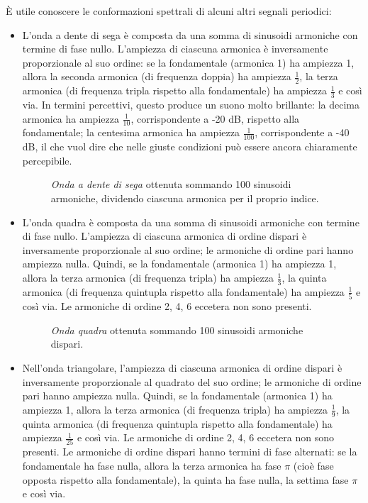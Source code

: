 È utile conoscere le conformazioni spettrali di alcuni altri segnali periodici:

\begin{itemize}

\item L'onda a dente di sega è composta da una somma di sinusoidi armoniche con termine di fase nullo. L'ampiezza di ciascuna armonica è inversamente proporzionale al suo ordine: se la fondamentale (armonica 1) ha ampiezza 1, allora la seconda armonica (di frequenza doppia) ha ampiezza $\frac{1}{2}$, la terza armonica (di frequenza tripla rispetto alla fondamentale) ha ampiezza $\frac{1}{3}$ e così via. In termini percettivi, questo produce un suono molto brillante: la decima armonica ha ampiezza $\frac{1}{10}$, corrispondente a -20 dB, rispetto alla fondamentale; la centesima armonica ha ampiezza $\frac{1}{100}$, corrispondente a -40 dB, il che vuol dire che nelle giuste condizioni può essere ancora chiaramente percepibile.

\begin{figure}
    \begin{center}
       \scalebox{0.6} {}
    \end{center}
    \caption{\emph{Onda a dente di sega} ottenuta sommando 100 sinusoidi armoniche, dividendo ciascuna armonica per il proprio indice.}
\end{figure}

\item L'onda quadra è composta da una somma di sinusoidi armoniche con termine di fase nullo. L'ampiezza di ciascuna armonica di ordine dispari è inversamente proporzionale al suo ordine; le armoniche di ordine pari hanno ampiezza nulla. Quindi, se la fondamentale (armonica 1) ha ampiezza 1, allora la terza armonica (di frequenza tripla) ha ampiezza $\frac{1}{3}$, la quinta armonica (di frequenza quintupla rispetto alla fondamentale) ha ampiezza $\frac{1}{5}$ e così via. Le armoniche di ordine 2, 4, 6 eccetera non sono presenti.

\begin{figure}
    \begin{center}
       \scalebox{0.6} {}
    \end{center}
    \caption{\emph{Onda quadra} ottenuta sommando 100 sinusoidi armoniche dispari.}
\end{figure}

\item Nell'onda triangolare, l'ampiezza di ciascuna armonica di ordine dispari è inversamente proporzionale al quadrato del suo ordine; le armoniche di ordine pari hanno ampiezza nulla. Quindi, se la fondamentale (armonica 1) ha ampiezza 1, allora la terza armonica (di frequenza tripla) ha ampiezza $\frac{1}{9}$, la quinta armonica (di frequenza quintupla rispetto alla fondamentale) ha ampiezza $\frac{1}{25}$ e così via. Le armoniche di ordine 2, 4, 6 eccetera non sono presenti. Le armoniche di ordine dispari hanno termini di fase alternati: se la fondamentale ha fase nulla, allora la terza armonica ha fase $\pi$ (cioè fase opposta rispetto alla fondamentale), la quinta ha fase nulla, la settima fase $\pi$ e così via.


\end{itemize}
